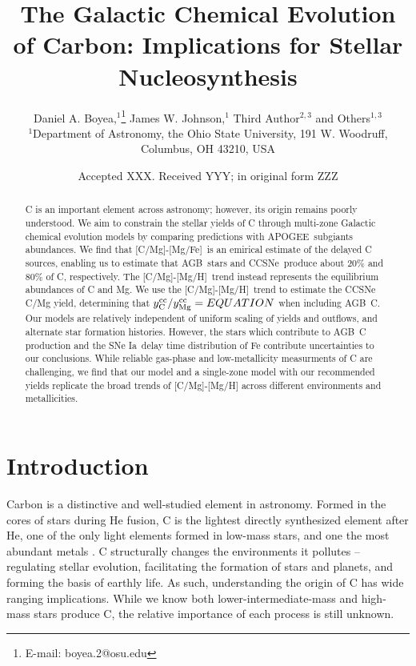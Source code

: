 \documentclass[fleqn,
usenatbib]{mnras}
\title[The Origin and Galactic Evolution of Carbon]{The Galactic Chemical Evolution of Carbon: Implications for Stellar Nucleosynthesis }
\author[D. A. Boyea et. al.]{
Daniel A. Boyea,$^{1}$\thanks{E-mail: boyea.2@osu.edu}
James W. Johnson,$^{1}$
Third Author$^{2,3}$
and Others$^{1,3}$
\\
$^{1}$Department of Astronomy, the Ohio State University, 191 W. Woodruff, Columbus, OH 43210, USA
}
\date{Accepted XXX. Received YYY; in original form ZZZ}
\newcommand{\agb}{AGB}
\newcommand{\apogee}{APOGEE}
\newcommand{\cc}{CCSNe}
\newcommand{\ia}{SNe Ia}
\newcommand{\caah}{[C/Mg]-[Mg/H]}
\newcommand{\caafe}{[C/Mg]-[Mg/Fe]}
\newcommand{\Ycc}{\ensuremath{y_{\rm C}^{\rm cc}}}
\newcommand{\Yoc}{\ensuremath{y_{\rm Mg}^{\rm cc}}}
\begin{document}
\label{firstpage}
\pagerange{\pageref{firstpage}--\pageref{lastpage}}
\maketitle



\begin{abstract}
C is an important element across astronomy; however, its origin remains poorly understood. 
% 
We aim to constrain the stellar yields of C through multi-zone Galactic chemical evolution models by comparing predictions with \apogee\ subgiants abundances.
% 
We find that \caafe\ is an emirical estimate of the delayed C sources, enabling us to estimate that \agb\ stars and \cc\ produce about 20\% and 80\% of C, respectively.  
The \caah\ trend instead represents the equilibrium abundances of C and Mg. 
We use the \caah\ trend to estimate the CCSNe C/Mg yield, determining that  $\Ycc/\Yoc = EQUATION$ when including \agb\ C. 
Our models are relatively independent of uniform scaling of yields and outflows, and alternate star formation histories. 
However, the stars which contribute to \agb\ C production and the \ia\ delay time distribution of Fe contribute uncertainties to our conclusions. 
While reliable gas-phase and low-metallicity measurments of C are challenging, we find that our model and a single-zone model with our recommended yields replicate the broad trends of \caah{} across different environments and metallicities. 

\end{abstract}







\section{Introduction}


Carbon is a distinctive and well-studied element in astronomy. 
Formed in the cores of stars during He fusion, C is the lightest directly synthesized element after He, one of the only light elements formed in low-mass stars, and one the most abundant metals \citep[e.g.][]{jennifer19, KL14}.\footnotemark{}
C structurally changes the environments it pollutes -- regulating stellar evolution, facilitating the formation of stars and planets, and forming the basis of earthly life.
As such, understanding the origin of C has wide ranging implications. 
While we know both lower-intermediate-mass and high-mass stars produce C, the relative importance of each process is still unknown.
\end{document}

